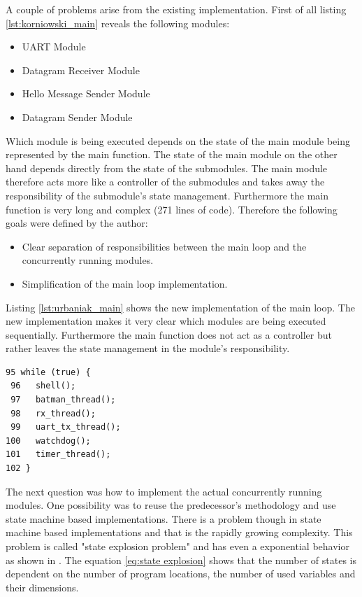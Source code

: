 A couple of problems arise from the existing implementation. First of all listing \ref{lst:korniowski_main} reveals the following modules:

\begin{itemize}
    \item UART Module
    \item Datagram Receiver Module
    \item Hello Message Sender Module
    \item Datagram Sender Module
\end{itemize}

Which module is being executed depends on the state of the main module being represented by the main function. The state of the main module on the other hand depends directly from the state of the submodules. The main module therefore acts more like a controller of the submodules and takes away the responsibility of the submodule's state management. Furthermore the main function is very long and complex (271 lines of code). Therefore the following goals were defined by the author:

\begin{itemize}
    \item Clear separation of responsibilities between the main loop and the concurrently running modules.
    \item Simplification of the main loop implementation.
\end{itemize}

Listing \ref{lst:urbaniak_main} shows the new implementation of the main loop. The new implementation makes it very clear which modules are being executed sequentially. Furthermore the main function does not act as a controller but rather leaves the state management in the module's responsibility.

\begin{lstlisting}[label=lst:urbaniak_main,caption=main function implementation]
 95 while (true) {
 96   shell();
 97   batman_thread();
 98   rx_thread();
 99   uart_tx_thread();
100   watchdog();
101   timer_thread();
102 }
\end{lstlisting}

The next question was how to implement the actual concurrently running modules. One possibility was to reuse the predecessor's methodology and use state machine based implementations. There is a problem though in state machine based implementations and that is the rapidly growing complexity. This problem is called "state explosion problem" and has even a exponential behavior as shown in \cite{katoen}. The equation \ref{eq:state explosion} shows that the number of states is dependent on the number of program locations, the number of used variables and their dimensions.

